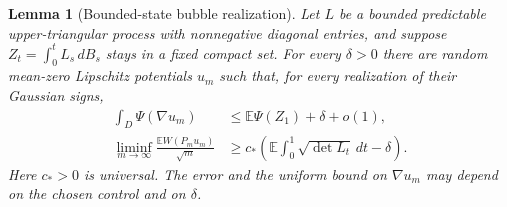 \documentclass[11pt]{article}
\newtheorem{lemma}[theorem]{Lemma}
\newcommand{\E}{\mathbb E}
\numberwithin{equation}{section}
\begin{document}
\begin{lemma}[Bounded-state bubble realization]\label{lower:lem:spatial}
Let \(L\) be a bounded predictable upper-triangular process with
nonnegative diagonal entries, and suppose
\(Z_t=\int_0^tL_s\,dB_s\) stays in a fixed compact set.  For every
\(\delta>0\) there are random mean-zero Lipschitz potentials \(u_m\)
such that, for every realization of their Gaussian signs,
\begin{align}
 \int_D\Psi(\nabla u_m)&\le\E\Psi(Z_1)+\delta+o(1),
       \label{lower:eq:pathwise-cost}\\
 \liminf_{m\to\infty}\frac{\E W(P_mu_m)}{\sqrt m}
   &\ge c_*\left(\E\int_0^1\sqrt{\det L_t}\,dt-\delta\right).
       \label{lower:eq:spatial-reward}
\end{align}
Here \(c_*>0\) is universal.  The error and the uniform bound on
\(\nabla u_m\) may depend on the chosen control and on \(\delta\).
\end{lemma}
\end{document}

